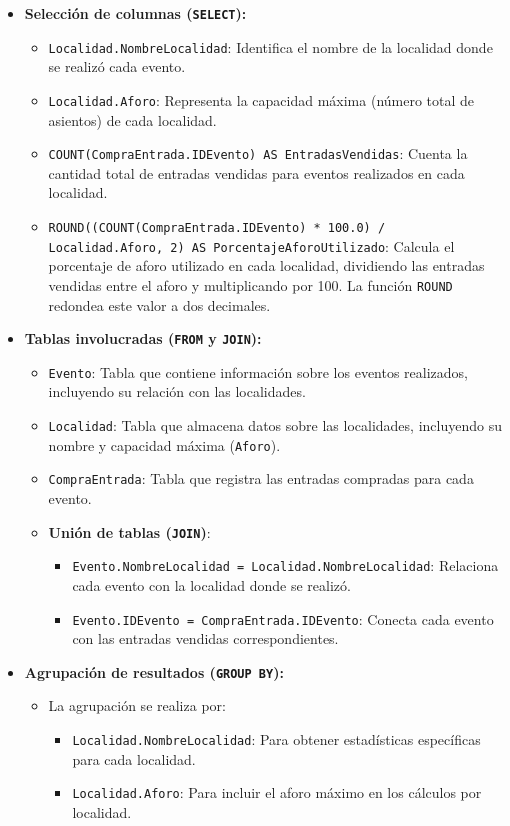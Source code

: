 \begin{itemize} \item \textbf{Selección de columnas (\texttt{SELECT}):} \begin{itemize} \item \texttt{Localidad.NombreLocalidad}: Identifica el nombre de la localidad donde se realizó cada evento. \item \texttt{Localidad.Aforo}: Representa la capacidad máxima (número total de asientos) de cada localidad. \item \texttt{COUNT(CompraEntrada.IDEvento) AS EntradasVendidas}: Cuenta la cantidad total de entradas vendidas para eventos realizados en cada localidad. \item \texttt{ROUND((COUNT(CompraEntrada.IDEvento) * 100.0) / Localidad.Aforo, 2) AS PorcentajeAforoUtilizado}: Calcula el porcentaje de aforo utilizado en cada localidad, dividiendo las entradas vendidas entre el aforo y multiplicando por 100. La función \texttt{ROUND} redondea este valor a dos decimales. \end{itemize}
	
	\item \textbf{Tablas involucradas (\texttt{FROM} y \texttt{JOIN}):} \begin{itemize} \item \texttt{Evento}: Tabla que contiene información sobre los eventos realizados, incluyendo su relación con las localidades. \item \texttt{Localidad}: Tabla que almacena datos sobre las localidades, incluyendo su nombre y capacidad máxima (\texttt{Aforo}). \item \texttt{CompraEntrada}: Tabla que registra las entradas compradas para cada evento. \item \textbf{Unión de tablas (\texttt{JOIN})}: \begin{itemize} \item \texttt{Evento.NombreLocalidad = Localidad.NombreLocalidad}: Relaciona cada evento con la localidad donde se realizó. \item \texttt{Evento.IDEvento = CompraEntrada.IDEvento}: Conecta cada evento con las entradas vendidas correspondientes. \end{itemize} \end{itemize}
	
	\item \textbf{Agrupación de resultados (\texttt{GROUP BY}):} \begin{itemize} \item La agrupación se realiza por: \begin{itemize} \item \texttt{Localidad.NombreLocalidad}: Para obtener estadísticas específicas para cada localidad. \item \texttt{Localidad.Aforo}: Para incluir el aforo máximo en los cálculos por localidad. \end{itemize} \end{itemize}
	

\end{itemize}
